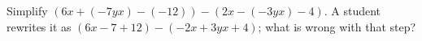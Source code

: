 Simplify $(6x+(-7yx)-(-12))-(2x-(-3yx)-4)$. A student rewrites it as $(6x-7+12)-(-2x+3yx+4)$; what is wrong with that step?
